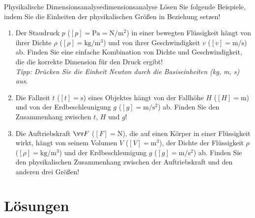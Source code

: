 \documentclass[ngerman]{scrreprt}
\begin{document}
\begin{aufgabebox}{Physikalische Dimensionsanalyse}{dimensionsanalyse}
Lösen Sie folgende Beispiele, indem Sie die Einheiten der physikalischen Größen in Beziehung setzen!
\begin{enumerate}[itemsep=8pt]
    \item Der Staudruck $p$ ($[p] = \si{\pascal} = \si{\newton\per\meter\squared}$) in einer bewegten Flüssigkeit hängt von ihrer Dichte $\rho$ ($[\rho] = \si{\kilo\gram\per\meter\cubed}$) und von ihrer Geschwindigkeit $v$ ($[v] = \si{\meter\per\second}$) ab. Finden Sie eine einfache Kombination von Dichte und Geschwindigkeit, die die korrekte Dimension für den Druck ergibt!\\
    \textit{Tipp: Drücken Sie die Einheit Newton durch die Basiseinheiten (\si{\kilo\gram}, \si{\meter}, \si{\second}) aus.}
    
    \item Die Fallzeit $t$ ($[t] = \si{\second}$) eines Objektes hängt von der Fallhöhe $H$ ($[H] = \si{\meter}$) und von der Erdbeschleunigung $g$ ($[g] = \si{\meter\per\second\squared}$) ab. Finden Sie den Zusammenhang zwischen $t$, $H$ und $g$!
    
    \item Die Auftriebskraft $\ivec{F}$ ($[F] = \si{\newton}$), die auf einen Körper in einer Flüssigkeit wirkt, hängt von seinem Volumen $V$ ($[V] = \si{\meter\cubed}$), der Dichte der Flüssigkeit $\rho$ ($[\rho] = \si{\kilo\gram\per\meter\cubed}$) und der Erdbeschleunigung $g$ ($[g] = \si{\meter\per\second\squared}$) ab. Finden Sie den physikalischen Zusammenhang zwischen der Auftriebskraft und den anderen drei Größen!
\end{enumerate}
\end{aufgabebox}



\newpage
\section{Lösungen}\label{sec: grundbegriffe_loesungen}
\end{document}
